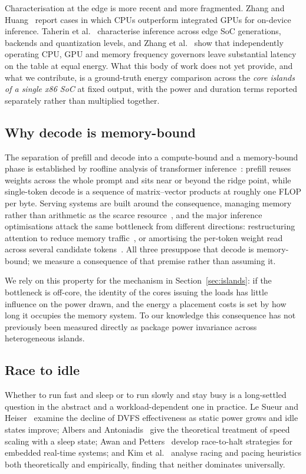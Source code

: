 \documentclass[journal]{IEEEtran}
\begin{document}
Characterisation at the edge is more recent and more fragmented. Zhang and
Huang~\cite{cpuoutperform2025} report cases in which CPUs outperform integrated
GPUs for on-device inference. Taherin et al.~\cite{hydra2026} characterise
inference across edge SoC generations, backends and quantization levels, and
Zhang et al.~\cite{mobiledvfs2025} show that independently operating CPU, GPU
and memory frequency governors leave substantial latency on the table at equal
energy. What this body of work does not yet provide, and what we contribute, is
a ground-truth energy comparison across the \emph{core islands of a single x86
SoC} at fixed output, with the power and duration terms reported separately
rather than multiplied together.

\subsection{Why decode is memory-bound}
The separation of prefill and decode into a compute-bound and a memory-bound
phase is established by roofline analysis of transformer
inference~\cite{yuan2024roofline}: prefill reuses weights across the whole
prompt and sits near or beyond the ridge point, while single-token decode is a
sequence of matrix--vector products at roughly one FLOP per byte. Serving
systems are built around the consequence, managing memory rather than
arithmetic as the scarce resource~\cite{kwon2023pagedattention}, and the
major inference optimisations attack the same bottleneck from different
directions: restructuring attention to reduce memory
traffic~\cite{dao2022flashattention}, or amortising the per-token weight read
across several candidate tokens~\cite{leviathan2023speculative}. All three
presuppose that decode is memory-bound; we measure a consequence of that
premise rather than assuming it.

We rely on this property for the mechanism in Section~\ref{sec:islands}: if the
bottleneck is off-core, the identity of the cores issuing the loads has little
influence on the power drawn, and the energy a placement costs is set by how
long it occupies the memory system. To our knowledge this consequence has not
previously been measured directly as package power invariance across
heterogeneous islands.

\subsection{Race to idle}
Whether to run fast and sleep or to run slowly and stay busy is a long-settled
question in the abstract and a workload-dependent one in practice. Le Sueur and
Heiser~\cite{lesueur2011slowdown} examine the decline of DVFS effectiveness as
static power grows and idle states improve; Albers and
Antoniadis~\cite{albers2014race} give the theoretical treatment of speed
scaling with a sleep state; Awan and Petters~\cite{awan2014racetohalt} develop
race-to-halt strategies for embedded real-time systems; and Kim et
al.~\cite{kim2015racing} analyse racing and pacing heuristics both
theoretically and empirically, finding that neither dominates universally.
\end{document}
